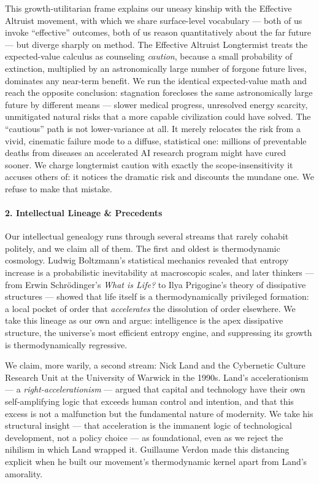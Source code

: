 This growth-utilitarian frame explains our uneasy kinship with the
Effective Altruist movement, with which we share surface-level
vocabulary --- both of us invoke ``effective'' outcomes, both of us
reason quantitatively about the far future --- but diverge sharply on
method. The Effective Altruist Longtermist treats the expected-value
calculus as counseling \emph{caution}, because a small probability of
extinction, multiplied by an astronomically large number of forgone
future lives, dominates any near-term benefit. We run the identical
expected-value math and reach the opposite conclusion: stagnation
forecloses the same astronomically large future by different means ---
slower medical progress, unresolved energy scarcity, unmitigated natural
risks that a more capable civilization could have solved. The
``cautious'' path is not lower-variance at all. It merely relocates the
risk from a vivid, cinematic failure mode to a diffuse, statistical one:
millions of preventable deaths from diseases an accelerated AI research
program might have cured sooner. We charge longtermist caution with
exactly the scope-insensitivity it accuses others of: it notices the
dramatic risk and discounts the mundane one. We refuse to make that
mistake.

\paragraph{2. Intellectual Lineage \&
Precedents}\label{intellectual-lineage-precedents-11}

Our intellectual genealogy runs through several streams that rarely
cohabit politely, and we claim all of them. The first and oldest is
thermodynamic cosmology. Ludwig Boltzmann's statistical mechanics
revealed that entropy increase is a probabilistic inevitability at
macroscopic scales, and later thinkers --- from Erwin Schrödinger's
\emph{What is Life?} to Ilya Prigogine's theory of dissipative
structures --- showed that life itself is a thermodynamically privileged
formation: a local pocket of order that \emph{accelerates} the
dissolution of order elsewhere. We take this lineage as our own and
argue: intelligence is the apex dissipative structure, the universe's
most efficient entropy engine, and suppressing its growth is
thermodynamically regressive.

We claim, more warily, a second stream: Nick Land and the Cybernetic
Culture Research Unit at the University of Warwick in the 1990s. Land's
accelerationism --- a \emph{right-accelerationism} --- argued that
capital and technology have their own self-amplifying logic that exceeds
human control and intention, and that this excess is not a malfunction
but the fundamental nature of modernity. We take his structural insight
--- that acceleration is the immanent logic of technological
development, not a policy choice --- as foundational, even as we reject
the nihilism in which Land wrapped it. Guillaume Verdon made this
distancing explicit when he built our movement's thermodynamic kernel
apart from Land's amorality.

